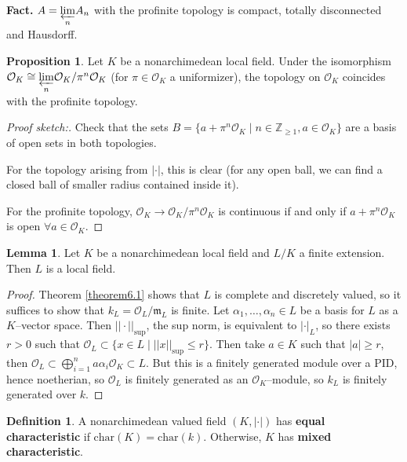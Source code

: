 \documentclass{article}
\theoremstyle{definition}
\newtheorem{lemma}[theorem]{Lemma}
\newtheorem{prop}[theorem]{Proposition}
\newtheorem{defn}{Definition}[section]
\begin{document}
\textbf{Fact.} $A = \underset{n}{\varprojlim} A_n $ with the profinite topology is compact, totally disconnected and Hausdorff.
\begin{prop}
    Let $K$ be a nonarchimedean local field. Under the isomorphism $\mathcal{O}_K \cong \underset{n}{\varprojlim} \mathcal{O}_K/\pi^n \mathcal{O}_K$ (for $\pi \in \mathcal{O}_K$ a uniformizer), the topology on $\mathcal{O}_K$ coincides with the profinite topology.
\end{prop}
\begin{proof}[Proof sketch:]
    Check that the sets $B = \{a + \pi^n \mathcal{O}_K \mid n \in \mathbb{Z}_{\ge 1}, a \in \mathcal{O}_K\}$ are a basis of open sets in both topologies. 
    \vspace{1mm}
    
    For the topology arising from $|\cdot|$, this is clear (for any open ball, we can find a closed ball of smaller radius contained inside it). 
    \vspace{1mm}
    
    For the profinite topology, $\mathcal{O}_K \to \mathcal{O}_K/\pi^n \mathcal{O}_K$ is continuous if and only if $a + \pi^n \mathcal{O}_K$ is open $\forall a \in \mathcal{O}_K$.
\end{proof}
\begin{lemma}
    Let $K$ be a nonarchimedean local field and $L/K$ a finite extension. Then $L$ is a local field.
\end{lemma}
\begin{proof}
    Theorem \ref{theorem6.1} shows that $L$ is complete and discretely valued, so it suffices to show that $k_L = \mathcal{O}_L/\mathfrak{m}_L$ is finite. Let $\alpha_1,\ldots,\alpha_n \in L$ be a basis for $L$ as a $K$--vector space. Then $||\cdot||_{\text{sup}}$, the sup norm, is equivalent to $|\cdot|_L$, so there exists $r>0$ such that $\mathcal{O}_L \subset \{x \in L \mid ||x||_{\text{sup}} \le r\}$. Then take $a \in K$ such that $|a|\ge r$, then $\mathcal{O}_L \subset \bigoplus_{i=1}^n a \alpha_i \mathcal{O}_K \subset L$. But this is a finitely generated module over a PID, hence noetherian, so $\mathcal{O}_L$ is finitely generated as an $\mathcal{O}_K$--module, so $k_L$ is finitely generated over $k$.
\end{proof}
\begin{defn}
    A nonarchimedean valued field $(K, |\cdot|)$ has \textbf{equal characteristic} if $\text{char}(K) = \text{char}(k)$. Otherwise, $K$ has \textbf{mixed characteristic}.
\end{defn}
\end{document}
